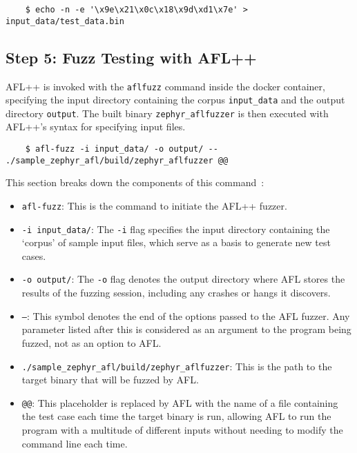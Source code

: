 \begin{verbatim}
    $ echo -n -e '\x9e\x21\x0c\x18\x9d\xd1\x7e' > input_data/test_data.bin
\end{verbatim}

\subsection*{Step 5: Fuzz Testing with AFL++}
AFL++ is invoked with the \texttt{afl\-fuzz} command inside the docker container,
specifying the input directory containing the corpus \texttt{input\_data} and
the output directory \texttt{output}. The built binary \texttt{zephyr\_aflfuzzer}
is then executed with AFL++'s syntax for specifying input files.


\begin{verbatim}
    $ afl-fuzz -i input_data/ -o output/ -- ./sample_zephyr_afl/build/zephyr_aflfuzzer @@
\end{verbatim}

This section breaks down the components of this command~\cite{257204}:

\begin{itemize}
    \item \texttt{afl-fuzz}: This is the command to initiate the AFL++ fuzzer.
    \item \texttt{-i input\_data/}: The \texttt{-i} flag specifies the
    input directory containing the `corpus' of sample input files,
    which serve as a basis to generate new test cases.
    \item \texttt{-o output/}: The \texttt{-o} flag denotes the output
    directory where AFL stores the results of the fuzzing session,
    including any crashes or hangs it discovers.
    \item \texttt{--}: This symbol denotes the end of the options passed
    to the AFL fuzzer. Any parameter listed after this is considered as
    an argument to the program being fuzzed, not as an option to AFL.
    \item \texttt{./sample\_zephyr\_afl/build/zephyr\_aflfuzzer}: This is the
    path to the target binary that will be fuzzed by AFL.
    \item \texttt{@@}: This placeholder is replaced by AFL with the name of a
    file containing the test case each time the target binary is run,
    allowing AFL to run the program with a multitude of different inputs
    without needing to modify the command line each time.
\end{itemize}
